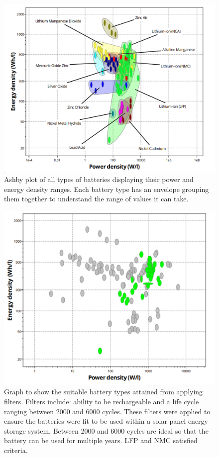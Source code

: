 \documentclass{article}
\begin{document}
\begin{figure}[hbt]
    \centering
    \includegraphics[width=1\linewidth]{Screenshot 2024-03-16 at 22.29.27.png}
    \caption{Ashby plot of all types of batteries displaying their power and energy density ranges. Each battery type has an envelope grouping them together to understand the range of values it can take.}
    \label{fig:2}
\end{figure}

\begin{figure}[hbt!]
    \centering
    \includegraphics[width=1\linewidth]{filter graph.png}
    \caption{Graph to show the suitable battery types attained from applying filters. Filters include: ability to be rechargeable and a life cycle ranging between 2000 and 6000 cycles. These filters were applied to ensure the batteries were fit to be used within a solar panel energy storage system. Between 2000 and 6000 cycles are ideal so that the battery can be used for multiple years. LFP and NMC satisfied criteria.}
    \label{fig:3 }
\end{figure}
\end{document}
